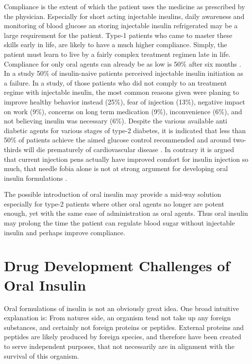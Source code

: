 Compliance is the extent of which the patient uses the medicine as prescribed by the physician. Especially for short acting injectable insulins, daily awareness and monitoring of blood glucose an storing injectable insulin refrigerated may be a large requirement for the patient. Type-1 patients who came to master these skills early in life, are likely to have a much higher compliance. Simply, the patient must learn to live by a fairly complex treatment regimen late in life. Compliance for only oral agents can already be as low is 50\% after six months \cite{garcia2013adherence}. In a study 50\% of insulin-naive patients perceived injectable insulin initiation as a failure. In a study, of those patients who did not comply to an treatment regime with injectable insulin, the most common reasons given were planing to improve healthy behavior instead (25\%), fear of injection (13\%), negative impact on work (9\%), concerns on long term medication (9\%), inconvenience (6\%), and not believing insulin was necessary (6\%). Despite the various available anti diabetic agents for various stages of type-2 diabetes, it is indicated that less than 50\% of patients achieve the aimed glucose control recommended and around two-thirds will die prematurely of cardiovascular disease \cite{garcia2013adherence}. In contrary it is argued that current injection pens actually have improved comfort for insulin injection so much, that needle fobia alone is not at strong argument for developing oral insulin formulations \cite{maher2014formulation}.

The possible introduction of oral insulin may provide a mid-way solution especially for type-2 patients where other oral agents no longer are potent enough, yet with the same ease of administration as oral agents. Thus oral insulin may prolong the time the patient can regulate blood sugar without injectable insulin and perhaps improve compliance.

\section{Drug Development Challenges of Oral Insulin}
Oral formulations of insulin is not an obviously great idea. One broad intuitive explanation is: From natures side, an organism tend not take up any foreign substances, and certainly not foreign proteins or peptides. External proteins and peptides are likely produced by foreign species, and therefore have been created to serve independent purposes, that not necessarily are in alignment with the survival of this organism.

